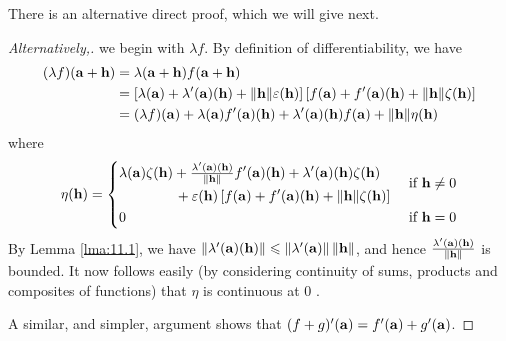 \documentclass[a4paper,11pt]{article}
\begin{document}
There is an alternative direct proof, which we will give next.

\begin{proof}[Alternatively,]
    we begin with $\lambda f$. By definition of differentiability, we have
$$
\begin{aligned}
(\lambda f)({\bf a}+{\bf h}) &=\lambda({\bf a}+{\bf h}) f({\bf a}+{\bf h}) \\
&=\left[\lambda({\bf a})+\lambda^{\prime}({\bf a})({\bf h})+\|{\bf h}\| \varepsilon({\bf h})\right]\left[f({\bf a})+f^{\prime}({\bf a})({\bf h})+\|{\bf h}\| \zeta({\bf h})\right] \\
&=(\lambda f)({\bf a})+\lambda({\bf a}) f^{\prime}({\bf a})({\bf h})+\lambda^{\prime}({\bf a})({\bf h}) f({\bf a})+\|{\bf h}\| \eta({\bf h})
\end{aligned}
$$
where
$$
\eta({\bf h})= \begin{cases}
    \begin{aligned}
        &\lambda({\bf a}) \zeta({\bf h})+\tfrac{\lambda^{\prime}({\bf a})({\bf h})}{\|{\bf h}\|} f^{\prime}({\bf a})({\bf h})+\lambda^{\prime}({\bf a})({\bf h}) \zeta({\bf h})\\ &\hspace{4em}+\varepsilon({\bf h})\left[f({\bf a})+f^{\prime}({\bf a})({\bf h})+\|{\bf h}\| \zeta({\bf h})\right]
    \end{aligned}
    & \text { if } {\bf h} \neq 0 \\[1em] 0 & \text { if } {\bf h}=0\end{cases}
$$
By Lemma \ref{lma:11.1}, we have $\left\|\lambda^{\prime}({\bf a})({\bf h})\right\| \leqslant\left\|\lambda^{\prime}({\bf a})\right\|\|{\bf h}\|$, and hence $\frac{\lambda^{\prime}({\bf a})({\bf h})}{\|{\bf h}\|}$ is bounded. It now follows easily (by considering continuity of sums, products and composites of functions) that $\eta$ is continuous at 0 .

A similar, and simpler, argument shows that $(f+g)^{\prime}({\bf a})=f^{\prime}({\bf a})+g^{\prime}({\bf a})$.
\end{proof}
\end{document}
